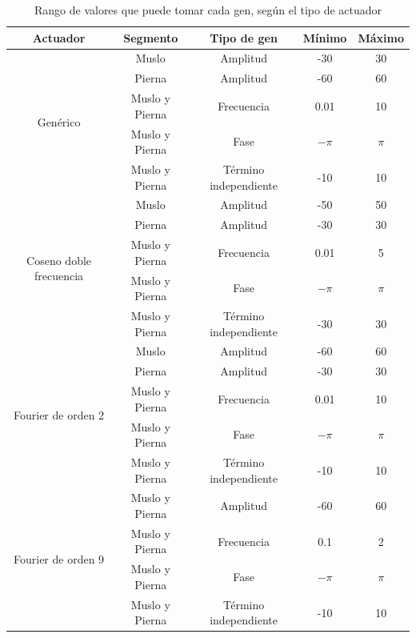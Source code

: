 \documentclass{article}
\begin{document}
\begin{table}[H]%
  \centering
  	\begin{tabular}{ | c | c | c || c | c | }
	  		\hline
	  		\textbf{Actuador} & \textbf{Segmento} & \textbf{Tipo de gen} & \textbf{M\'inimo} & \textbf{M\'aximo} \\
			\hline
			\multirow{5}{*}{Gen\'erico} & Muslo & Amplitud & -30 & 30\\ \cline{2-5}
								&Pierna & Amplitud & -60 & 60\\ \cline{2-5}
	  							& Muslo y Pierna & Frecuencia & 0.01 & 10 \\ \cline{2-5}
	  							&Muslo y Pierna & Fase & $-\pi$ & $\pi$ \\ \cline{2-5}
								& Muslo y Pierna & T\'ermino independiente & -10 & 10 \\ 
	  		\hline 
			\hline
			\multirow{5}{*}{Coseno doble frecuencia} & Muslo & Amplitud & -50 & 50\\ \cline{2-5}
								& Pierna & Amplitud & -30 & 30\\ \cline{2-5}
	  							& Muslo y Pierna & Frecuencia & 0.01 & 5 \\ \cline{2-5}
	  							&Muslo y Pierna & Fase & $-\pi$ & $\pi$ \\ \cline{2-5}
								& Muslo y Pierna & T\'ermino independiente & -30 & 30 \\ \cline{2-5}
			\hline 
			\hline					
			\multirow{5}{*}{Fourier de orden 2} & Muslo & Amplitud & -60 & 60\\ \cline{2-5}
	  							&Pierna & Amplitud & -30 & 30 \\ \cline{2-5}
								& Muslo y Pierna & Frecuencia & 0.01 & 10 \\ \cline{2-5}
	  							&Muslo y Pierna & Fase & $-\pi$ & $\pi$ \\ \cline{2-5}
								& Muslo y Pierna & T\'ermino independiente & -10 & 10 \\
	  		\hline
			\hline
			\multirow{4}{*}{Fourier de orden 9} & Muslo y Pierna & Amplitud & -60 & 60\\ \cline{2-5}
	  							& Muslo y Pierna & Frecuencia & 0.1 & 2 \\ \cline{2-5}
	  							&Muslo y Pierna & Fase & $-\pi$ & $\pi$ \\ \cline{2-5}
								& Muslo y Pierna & T\'ermino independiente & -10 & 10 \\
			
			\hline
	\end{tabular}
  \captionsetup{justification=centering}
  \caption{Rango de valores que puede tomar cada gen, seg\'un el tipo de actuador }%
  \label{table4}%
\end{table}
\end{document}
